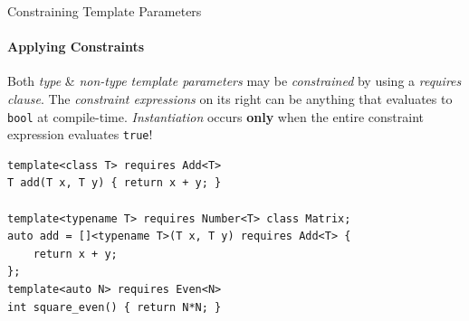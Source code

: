 \documentclass{beamer}
\begin{document}
    \begin{frame}[fragile]{Constraining Template Parameters}
        \framesubtitle{Applying Constraints}
        Both \emph{type} \& \emph{non-type template parameters} may be \emph{constrained} by using a \emph{requires clause}. The \emph{constraint expressions} on its right can be anything that evaluates to \texttt{bool} at compile-time. \emph{Instantiation} occurs \textbf{only} when the entire constraint expression evaluates \texttt{true}!
        \vspace{-1em}
        \begin{center}
        \begin{lstlisting}[caption={which even supports constraining C\texttt{++}20 generic lambdas!?}]
template<class T> requires Add<T>
T add(T x, T y) { return x + y; }

template<typename T> requires Number<T> class Matrix;
auto add = []<typename T>(T x, T y) requires Add<T> {
    return x + y;
};
template<auto N> requires Even<N>
int square_even() { return N*N; } \end{lstlisting}
        \end{center}
    \end{frame}
\end{document}
